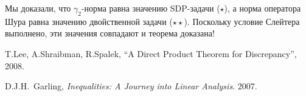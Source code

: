 \documentclass[handout]{beamer}
\begin{document}
\begin{frame}

    Мы доказали, что $\gamma_2$-норма равна значению SDP-задачи ($\star$),
        а норма оператора Шура равна значению двойственной задачи
        ($\star\star$). Поскольку условие Слейтера выполнено, эти значения
        совпадают и теорема доказана!
    \pause\vspace{5pt}

    \begin{thebibliography}{XXXX}
         T.Lee, A.Shraibman, R.Spalek, ``A Direct Product Theorem
            for Discrepancy'', 2008.

         D.J.H.~Garling, \textit{Inequalities: A Journey into Linear
            Analysis}. 2007.
    \end{thebibliography}
\end{frame}
\end{document}
